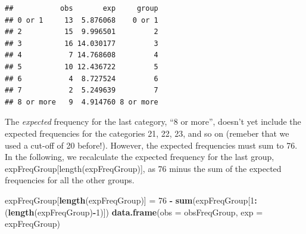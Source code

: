 \documentclass[]{article}
\newenvironment{Shaded}{\begin{snugshade}}{\end{snugshade}}
\newcommand{\DataTypeTok}[1]{\textcolor[rgb]{0.13,0.29,0.53}{#1}}
\newcommand{\DecValTok}[1]{\textcolor[rgb]{0.00,0.00,0.81}{#1}}
\newcommand{\KeywordTok}[1]{\textcolor[rgb]{0.13,0.29,0.53}{\textbf{#1}}}
\newcommand{\NormalTok}[1]{#1}
\newcommand{\OperatorTok}[1]{\textcolor[rgb]{0.81,0.36,0.00}{\textbf{#1}}}
\newcommand{\StringTok}[1]{\textcolor[rgb]{0.31,0.60,0.02}{#1}}
\begin{document}
\begin{Shaded}
\end{Shaded}

\begin{verbatim}
##           obs       exp     group
## 0 or 1     13  5.876068    0 or 1
## 2          15  9.996501         2
## 3          16 14.030177         3
## 4           7 14.768608         4
## 5          10 12.436722         5
## 6           4  8.727524         6
## 7           2  5.249639         7
## 8 or more   9  4.914760 8 or more
\end{verbatim}

The \emph{expected} frequency for the last category, ``8 or more'',
doesn't yet include the expected frequencies for the categories 21, 22,
23, and so on (remeber that we used a cut-off of 20 before!). However,
the expected frequencies must sum to 76. In the following, we
recalculate the expected frequency for the last group,
expFreqGroup{[}length(expFreqGroup){]}, as 76 minus the sum of the
expected frequencies for all the other groups.

\begin{Shaded}
\begin{Highlighting}[]
\NormalTok{expFreqGroup[}\KeywordTok{length}\NormalTok{(expFreqGroup)] =}\StringTok{ }\DecValTok{76} \OperatorTok{-}\StringTok{ }\KeywordTok{sum}\NormalTok{(expFreqGroup[}\DecValTok{1}\OperatorTok{:}\NormalTok{(}\KeywordTok{length}\NormalTok{(expFreqGroup)}\OperatorTok{-}\DecValTok{1}\NormalTok{)])}
\KeywordTok{data.frame}\NormalTok{(}\DataTypeTok{obs =}\NormalTok{ obsFreqGroup, }\DataTypeTok{exp =}\NormalTok{ expFreqGroup)}
\end{Highlighting}
\end{Shaded}
\end{document}
